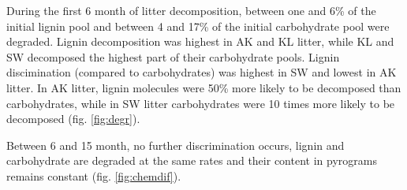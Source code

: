 \documentclass[authoryear,preprint,review,12pt]{elsarticle}
\begin{document}
%
%
%
%
During the first 6 month of litter decomposition, between one and 6\% of the initial lignin pool and between 4 and 17\% of the initial carbohydrate pool were degraded. Lignin decomposition was highest in AK and KL litter, while KL and SW decomposed the highest part of their carbohydrate pools. Lignin discimination (compared to carbohydrates) was highest in SW and lowest in AK litter. In AK litter, lignin molecules were 50\% more likely to be decomposed than carbohydrates, while in SW litter carbohydrates were 10 times more likely to be decomposed (fig. \ref{fig:degr}).

Between 6 and 15 month, no further discrimination occurs, lignin and carbohydrate are degraded at the same rates and their content in pyrograms remains constant (fig. \ref{fig:chemdif}).
\end{document}
